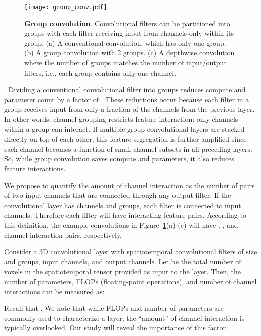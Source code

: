 \documentclass[10pt,twocolumn,letterpaper]{article}
\newcommand{\ddd}[1]{#1#1#1}
\begin{document}
\begin{figure}
\begin{center}
   \texttt{[image: group\_conv.pdf]}
\end{center}
\vspace{-10pt}
   \caption{{\bf Group convolution}. Convolutional filters can be partitioned into groups with each filter receiving input from channels only within its group. (a) A conventional convolution, which has only one group. (b) A group convolution with 2 groups. (c) A depthwise convolution where the number of groups matches the number of input/output filters, i.e., each group contains only one channel.}
\label{fig:group_conv}
\end{figure}

. Dividing a conventional convolutional filter into  groups reduces compute and parameter count by a factor of .  These reductions occur because each filter in a group receives input from only a fraction  of the channels from the previous layer.  In other words, channel grouping restricts feature interaction: only channels within a group can interact. If multiple group convolutional layers are stacked directly on top of each other, this feature segregation is further amplified since each channel becomes a function of small channel-subsets in all preceding layers. So, while group convolution saves compute and parameters, it also reduces feature interactions.

We propose to quantify the amount of channel interaction as the number of pairs of two input channels that are connected through any output filter. If the convolutional layer has  channels and  groups, each filter is connected to  input channels. Therefore each filter will have  interacting feature pairs. According to this definition, the example convolutions in Figure~\ref{fig:group_conv}(a)-(c) will have , , and  channel interaction pairs, respectively.

Consider a 3D convolutional layer with spatiotemporal convolutional filters of size \ddd{} and  groups,  input channels, and  output channels. Let   be the total number of voxels in the spatiotemporal tensor provided as input to the layer. Then, the number of parameters, FLOPs (floating-point operations), and number of channel interactions can be measured as:


Recall that . We note that while FLOPs and number of parameters are commonly used to characterize a layer, the ``amount'' of channel interaction is typically overlooked. Our study will reveal the importance of this factor.
\end{document}
